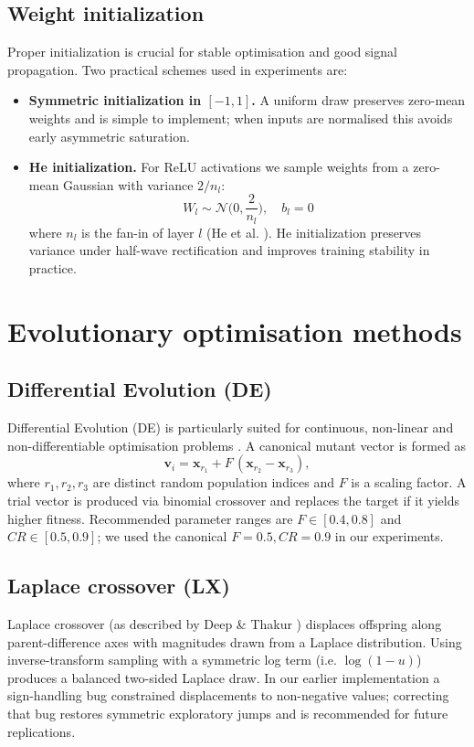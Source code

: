 \documentclass[12pt, a4paper]{article}
\begin{document}
\subsection{Weight initialization}
Proper initialization is crucial for stable optimisation and good signal propagation. Two practical schemes used in experiments are:
\begin{itemize}
  \item \textbf{Symmetric initialization in $[-1,1]$.} A uniform draw preserves zero-mean weights and is simple to implement; when inputs are normalised this avoids early asymmetric saturation.
  \item \textbf{He initialization.} For ReLU activations we sample weights from a zero-mean Gaussian with variance $2/n_l$:
  \begin{equation}
    W_l \sim \mathcal{N}\Big(0, \frac{2}{n_l}\Big), \quad b_l = 0
  \end{equation}
  where $n_l$ is the fan-in of layer $l$ (He et al. \cite{he2015}). He initialization preserves variance under half-wave rectification and improves training stability in practice.
\end{itemize}

\section{Evolutionary optimisation methods}

\subsection{Differential Evolution (DE)}
Differential Evolution (DE) is particularly suited for continuous, non-linear and non-differentiable optimisation problems \cite{storn1997}. A canonical mutant vector is formed as
\begin{equation}
  \mathbf{v}_i = \mathbf{x}_{r_1} + F\, (\mathbf{x}_{r_2} - \mathbf{x}_{r_3}),
\end{equation}
where $r_1,r_2,r_3$ are distinct random population indices and $F$ is a scaling factor. A trial vector is produced via binomial crossover and replaces the target if it yields higher fitness. Recommended parameter ranges are $F\in[0.4,0.8]$ and $CR\in[0.5,0.9]$; we used the canonical $F=0.5, CR=0.9$ in our experiments.

\subsection{Laplace crossover (LX)}
Laplace crossover (as described by Deep & Thakur \cite{deep2007}) displaces offspring along parent-difference axes with magnitudes drawn from a Laplace distribution. Using inverse-transform sampling with a symmetric log term (i.e. $\log(1-u)$) produces a balanced two-sided Laplace draw. In our earlier implementation a sign-handling bug constrained displacements to non-negative values; correcting that bug restores symmetric exploratory jumps and is recommended for future replications.
\end{document}
